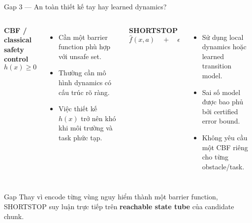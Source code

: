\documentclass[aspectratio=169]{beamer}
\begin{document}
\begin{frame}[t,shrink=8]{Gap 3 --- An toàn thiết kế tay hay learned dynamics?}
\begin{columns}[T]

\textbf{CBF / classical safety control}
\[
h(x)\geq 0
\]
\begin{itemize}
    \item Cần một barrier function phù hợp với unsafe set.
    \item Thường cần mô hình dynamics có cấu trúc rõ ràng.
    \item Việc thiết kế $h(x)$ trở nên khó khi môi trường và task phức tạp.
\end{itemize}

\textbf{SHORTSTOP}
\[
\hat f(x,a)
\quad+\quad
\epsilon
\]
\begin{itemize}
    \item Sử dụng local dynamics hoặc learned transition model.
    \item Sai số model được bao phủ bởi certified error bound.
    \item Không yêu cầu một CBF riêng cho từng obstacle/task.
\end{itemize}

\end{columns}
\vspace{6pt}

\begin{alertblock}{Gap}
Thay vì encode từng vùng nguy hiểm thành một barrier function,
SHORTSTOP suy luận trực tiếp trên \textbf{reachable state tube} của candidate chunk.
\end{alertblock}
\end{frame}

\end{document}
